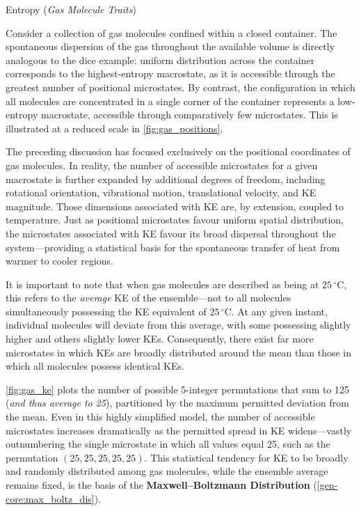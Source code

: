 \documentclass[10pt]{article}
\begin{document}
    \begin{core}{Entropy (\textit{Gas Molecule Traits})}

      Consider a collection of gas molecules confined within a closed container. The spontaneous dispersion of the gas throughout the available volume is directly analogous to the dice example: uniform distribution across the container corresponds to the highest-entropy macrostate, as it is accessible through the greatest number of positional microstates. By contrast, the configuration in which all molecules are concentrated in a single corner of the container represents a low-entropy macrostate, accessible through comparatively few microstates. This is illustrated at a reduced scale in \autoref{fig:gas_positions}.


      The preceding discussion has focused exclusively on the positional coordinates of gas molecules. In reality, the number of accessible microstates for a given macrostate is further expanded by additional degrees of freedom, including rotational orientation, vibrational motion, translational velocity, and KE magnitude. Those dimensions associated with KE are, by extension, coupled to temperature. Just as positional microstates favour uniform spatial distribution, the microstates associated with KE favour its broad dispersal throughout the system---providing a statistical basis for the spontaneous transfer of heat from warmer to cooler regions.

      It is important to note that when gas molecules are described as being at $25\,^\circ$C, this refers to the \textit{average} KE of the ensemble---not to all molecules simultaneously possessing the KE equivalent of $25\,^\circ$C. At any given instant, individual molecules will deviate from this average, with some possessing slightly higher and others slightly lower KEs. Consequently, there exist far more microstates in which KEs are broadly distributed around the mean than those in which all molecules possess identical KEs.


      \autoref{fig:gas_ke} plots the number of possible 5-integer permutations that sum to 125 (\textit{and thus average to 25}), partitioned by the maximum permitted deviation from the mean. Even in this highly simplified model, the number of accessible microstates increases dramatically as the permitted spread in KE widens---vastly outnumbering the single microstate in which all values equal 25, such as the permutation $(25, 25, 25, 25, 25)$. This statistical tendency for KE to be broadly and randomly distributed among gas molecules, while the ensemble average remains fixed, is the basis of the \textbf{Maxwell--Boltzmann Distribution} (\autoref{gen-core:max_boltz_dis}).

    \end{core}
\end{document}
